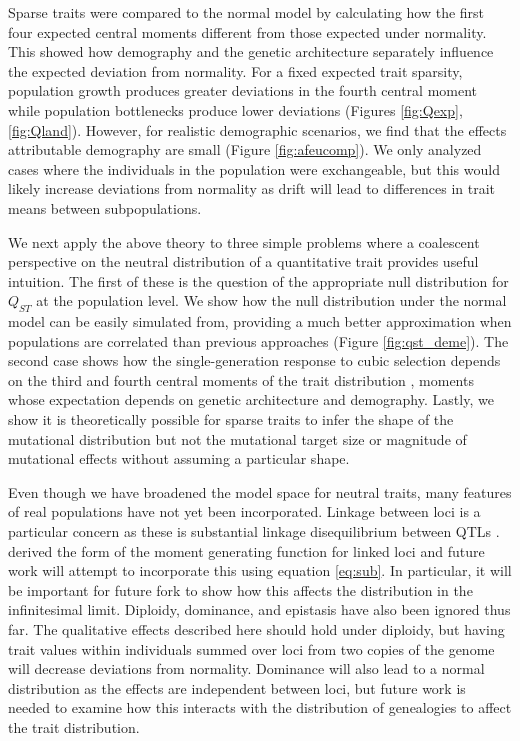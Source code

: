 Sparse traits were compared to the normal model by calculating how the first
four expected central moments different from those expected under normality.
This showed how demography and the genetic architecture separately influence the
expected deviation from normality. For a fixed expected trait sparsity,
population growth produces greater deviations in the fourth central moment while
population bottlenecks produce lower deviations (Figures
\ref{fig:Qexp},\ref{fig:Qland}). However, for realistic demographic scenarios,
we find that the effects attributable demography are small (Figure
\ref{fig:afeucomp}). We only analyzed cases where the individuals in the
population were exchangeable, but this would likely increase deviations from
normality as drift will lead to differences in trait means between
subpopulations.

We next apply the above theory to three simple problems where a coalescent
perspective on the neutral distribution of a quantitative trait provides useful
intuition. The first of these is the question of the appropriate null
distribution for $Q_{ST}$ at the population level. We show how the null
distribution under the normal model can be easily simulated from, providing a
much better approximation when populations are correlated than previous
approaches \citep{Whitlock2009} (Figure \ref{fig:qst_deme}). The second case
shows how the single-generation response to cubic selection depends on the third
and fourth central moments of the trait distribution \citep{Turelli1990},
moments whose expectation depends on genetic architecture and demography.
Lastly, we show it is theoretically possible for sparse traits to infer the
shape of the mutational distribution but not the mutational target size or
magnitude of mutational effects without assuming a particular shape.

Even though we have broadened the model space for neutral traits, many features
of real populations have not yet been incorporated. Linkage between loci is a
particular concern as these is substantial linkage disequilibrium between QTLs
\citep{Bulik-Sullivan2015}. \citet{Lohse2011} derived the form of the moment
generating function for linked loci and future work will attempt to incorporate
this using equation \eqref{eq:sub}. In particular, it will be important for
future fork to show how this affects the distribution in the infinitesimal
limit. Diploidy, dominance, and epistasis have also been ignored thus far. The
qualitative effects described here should hold under diploidy, but having trait
values within individuals summed over loci from two copies of the genome will
decrease deviations from normality. Dominance will also lead to a normal
distribution as the effects are independent between loci, but future work is
needed to examine how this interacts with the distribution of genealogies to
affect the trait distribution.

